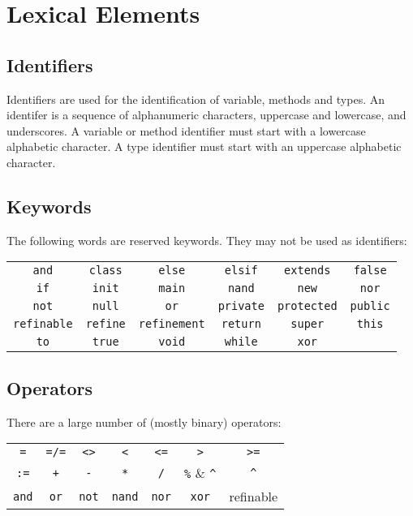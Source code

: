 \section{Lexical Elements}
\subsection{Identifiers}
Identifiers are used for the identification of variable,  methods and types. An identifer is a sequence of alphanumeric characters, uppercase and lowercase, and underscores. A variable or method identifier must start with a lowercase alphabetic character. A type identifier must start with an uppercase alphabetic character.

\subsection{Keywords}
The following words are reserved keywords. They may not be used as identifiers:
\begin{center}
\begin{tabular}{cccccc}
\verb!and! & \verb!class! & \verb!else! & \verb!elsif! & \verb!extends! & \verb!false!\\
\verb!if! & \verb!init! & \verb!main! & \verb!nand! & \verb!new! & \verb!nor!\\
\verb!not! & \verb!null! & \verb!or! & \verb!private! & \verb!protected! & \verb!public!\\
\verb!refinable! & \verb!refine! & \verb!refinement! & \verb!return! & \verb!super! & \verb!this!\\
\verb!to! & \verb!true! & \verb!void! & \verb!while! & \verb!xor!\\
\end{tabular}
\end{center}

\subsection{Operators}
There are a large number of (mostly binary) operators:
\begin{center}
\begin{tabular}{ccccccc}
\verb!=! & \verb!=/=! & \verb|<>| & \verb!<! & \verb!<=! & \verb!>! & \verb!>=!\\
\verb!:=! & \verb!+! & \verb!-! & \verb!*! & \verb!/! & \verb!%! & \verb!^!\\
\verb!and! & \verb!or! & \verb!not! & \verb!nand! & \verb!nor! & \verb!xor!&refinable\\
\end{tabular}
\end{center}

